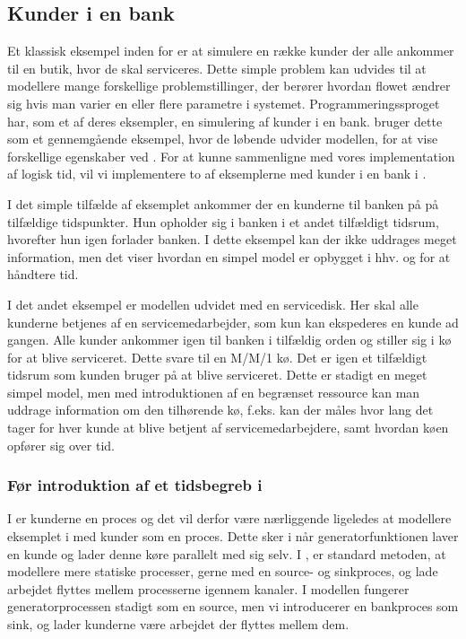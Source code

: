 

\subsection{Kunder i en bank}\label{bank-eksempel}
Et klassisk eksempel inden for \des er at simulere  en række kunder der alle 
ankommer til en butik, hvor de skal serviceres. Dette simple problem kan 
udvides til at modellere mange forskellige problemstillinger, der berører 
hvordan flowet ændrer sig hvis man varier en eller flere parametre
i systemet. Programmeringssproget \simpy{}har, som et af deres 
eksempler, en simulering af kunder i en bank. \simpy bruger dette som et 
gennemgående eksempel, hvor de løbende udvider modellen, for at vise 
forskellige egenskaber ved \simpy. For at kunne sammenligne \simpy  med vores 
implementation af logisk tid, vil vi implementere to af eksemplerne med kunder 
i en bank i \pycsp.

I det simple tilfælde af eksemplet ankommer der en kunderne til banken på på 
tilfældige tidspunkter.  Hun opholder sig i banken i et andet tilfældigt 
tidsrum, hvorefter hun igen forlader banken. I dette eksempel kan der ikke 
uddrages meget information, men det viser hvordan en simpel model er opbygget i 
hhv.  \simpy og \pycsp for at håndtere tid.

I det andet eksempel er modellen udvidet med en servicedisk. Her skal alle 
kunderne betjenes af en servicemedarbejder, som kun kan ekspederes en kunde ad 
gangen. Alle kunder ankommer igen til banken i tilfældig orden og stiller sig i 
kø for at blive serviceret. Dette  svare til en M/M/1 kø. Det er igen et tilfældigt tidsrum som kunden bruger på at blive 
serviceret.  Dette er stadigt en meget simpel model, men med introduktionen af 
en begrænset ressource kan man uddrage information om den tilhørende kø, f.eks. 
kan der måles hvor lang det tager for hver kunde at blive betjent af 
servicemedarbejdere, samt hvordan køen opfører sig over tid. 

\subsubsection{Før introduktion af et tidsbegreb i \pycsp}
I \simpy er kunderne en proces og det vil derfor være nærliggende ligeledes at 
modellere eksemplet i \pycsp med kunder som en proces. Dette sker i  \simpy når
generatorfunktionen laver en kunde og lader denne køre parallelt med sig selv.  
I \pycsp, er standard metoden, at 
modellere mere statiske processer, gerne med en source- og 
sinkproces, og lade arbejdet flyttes 
mellem processerne igennem kanaler. I \pycsp modellen fungerer 
generatorprocessen stadigt som en source, men vi introducerer en bankproces 
som sink, og lader kunderne være arbejdet der flyttes mellem dem. 

